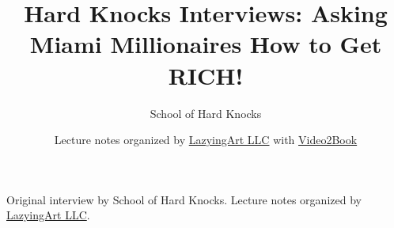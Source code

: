 \documentclass[11pt,oneside]{book}
\begin{document}
\frontmatter
\title{Hard Knocks Interviews: Asking Miami Millionaires How to Get RICH!}
\author{School of Hard Knocks}
\date{Lecture notes organized by \href{https://lazying.art}{LazyingArt LLC} with \href{https://github.com/lachlanchen/Video2Book}{Video2Book}}
\maketitle
\begin{center}
\small Original interview by School of Hard Knocks. Lecture notes organized by \href{https://lazying.art}{LazyingArt LLC}.
\end{center}
\clearpage
\mainmatter

\end{document}
